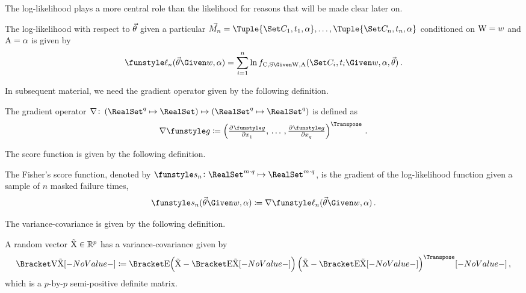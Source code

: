\documentclass[../main.tex]{subfiles}
\begin{document}
The log-likelihood plays a more central role than the likelihood for reasons that will be made clear later on.
\begin{definition}
\label{def:general_log_like}
The log-likelihood with respect to $\vec{\theta}$ given a particular $\mfs = \Tuple{\cand_1,t_1,\alpha},\ldots,\Tuple{\cand_n,t_n,\alpha}$ conditioned on $\mathrm{W} = w$ and $\mathrm{A} = \alpha$ is given by
\begin{equation}
\label{eq:log_like_mle}
\Fun{\ell_n}(\sysparamvec \Given w, \alpha) = \sum_{i=1}^{n} \ln \pdf_{\rvcand,\sv \Given \RV{W}, \RV{A}}(\cand_i, t_i \Given w, \alpha, \sysparamvec)\,.
\end{equation}
\end{definition}






In subsequent material, we need the gradient operator given by the following definition.
\begin{definition}
The gradient operator $\nabla \colon \left(\RealSet^q \mapsto \RealSet\right) \mapsto \left(\RealSet^q \mapsto \RealSet^q\right)$ is defined as
\begin{equation}
    \nabla \Fun{g} \coloneqq \left (
        \pd{\Fun{g}}{x_1},\,
        \ldots\,,
        \pd{\Fun{g}}{x_q}
    \right )^{\Transpose}\,.
\end{equation}
\end{definition}

The score function is given by the following definition.
\begin{definition}
The Fisher's score function, denoted by $\Fun{s_n} \colon \RealSet^{m \cdot q} \mapsto \RealSet^{m \cdot q}$, is the gradient of the log-likelihood function given a sample of $n$ masked failure times,
\begin{equation}
\label{eq:score}
    \Fun{s_n}(\sysparamvec \Given w, \alpha) \coloneqq \nabla \Fun{\ell_n}(\sysparamvec \Given w, \alpha)\,.
\end{equation}
\end{definition}

The variance-covariance is given by the following definition.
\begin{definition}
A random vector $\mathrm{\vec{X}} \in \mathbb{R}^{p}$ has a variance-covariance given by
\begin{equation}
\label{eq:covariance_matrix_op}
    \Var{\RV{\vec{X}}} \coloneqq \Expect{
        \left(\RV{\vec{X}} - \Expect{\RV{\vec{X}}} \right)
        \left(\RV{\vec{X}} - \Expect{\RV{\vec{X}}} \right)^\Transpose
    }\,,
\end{equation}
which is a $p$-by-$p$ semi-positive definite matrix.
\end{definition}
\end{document}
